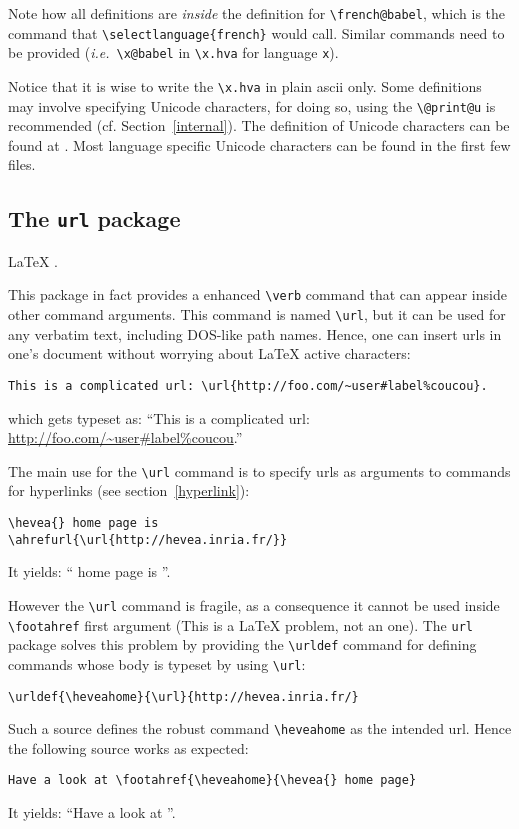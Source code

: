 Note how all definitions are \emph{inside} the definition for
\verb+\french@babel+, which is the command that
\verb+\selectlanguage{french}+ would call. Similar commands need to be
provided (\emph{i.e.}\ \verb+\x@babel+ in \verb+\x.hva+ for language
\verb+x+).

Notice that it is wise to write the \verb+\x.hva+ in plain ascii only.
Some definitions may involve specifying Unicode characters, for doing
so, using the \verb+\@print@u+ is recommended (cf. Section~\ref{internal}).
The definition of Unicode characters can be found at
.
Most language specific Unicode characters can be found in the first
few files.

\subsection{The \label{urlpackage}\texttt{url} package}
%
\LaTeX{} .

This package in fact provides a enhanced  \verb+\verb+ command that
can appear inside other command arguments.
This command is named \verb+\url+,
but it can be used for any verbatim text, including DOS-like path
names.
Hence, one can insert urls in one's document without worrying about
\LaTeX{} active characters:
\begin{verbatim}
This is a complicated url: \url{http://foo.com/~user#label%coucou}.
\end{verbatim}
which gets typeset as: ``This is a complicated url: \url{http://foo.com/~user#label%coucou}.''

The main use for the \verb+\url+ command is to specify urls as arguments to
\hevea{} commands for hyperlinks (see section~\ref{hyperlink}):
\begin{verbatim}
\hevea{} home page is
\ahrefurl{\url{http://hevea.inria.fr/}}
\end{verbatim}
It yields: ``\hevea{} home page is
''.

However the \verb+\url+ command is fragile, as a consequence it
cannot be used inside \verb+\footahref+ first argument (This is a
\LaTeX{} problem, not an \hevea{} one).
The \texttt{url} package solves this problem by providing the
\verb+\urldef+ command
for defining commands whose body is typeset by using \verb+\url+:
\begin{verbatim}
\urldef{\heveahome}{\url}{http://hevea.inria.fr/}
\end{verbatim}
%
Such a source defines the robust command \verb+\heveahome+ as the
intended url.
Hence the following source works as expected:
\begin{verbatim}
Have a look at \footahref{\heveahome}{\hevea{} home page}
\end{verbatim}
It yields: ``Have a look at ''.

